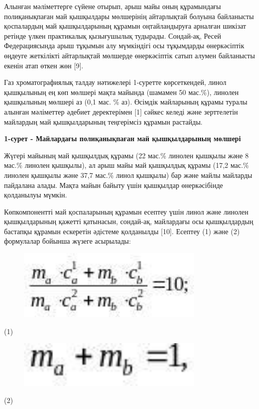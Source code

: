 Алынған мәліметтерге сүйене отырып, арыш майы оның құрамындағы
полиқанықпаған май қышқылдары мөлшерінің айтарлықтай болуына байланысты
қоспалардың май қышқылдарының құрамын оңтайландыруға арналған шикізат
ретінде үлкен практикалық қызығушылық тудырады. Сондай-ақ, Ресей
Федерациясында арыш тұқымын алу мүмкіндігі осы тұқымдарды өнеркәсіптік
өңдеуге жеткілікті айтарлықтай мөлшерде өнеркәсіптік сатып алумен
байланысты екенін атап өткен жөн {[}9{]}.

Газ хроматографиялық талдау нәтижелері 1-суретте көрсеткендей, линол
қышқылының ең көп мөлшері мақта майында (шамамен 50 мас.\%), линолен
қышқылының мөлшері аз (0,1 мас. \% аз). Өсімдік майларының құрамы туралы
алынған мәліметтер әдебиет деректерімен {[}1{]} сәйкес келеді және
зерттелетін майлардың май қышқылдарының теңгерімсіз құрамын растайды.

{\bfseries 1-сурет - Майлардағы полиқанықпаған май қышқылдарының мөлшері}

Жүгері майының май қышқылдық құрамы (22 мас.\% линолен қышқылы және 8
мас.\% линолен қышқылы), ал арыш майы май қышқылдық құрамы (17,2 мас.\%
линолен қышқылы және 37,7 мас.\% линол қышқылы) бар және майлы майларды
пайдалана алады. Мақта майын байыту үшін қышқылдар өнеркәсібінде
қолданылуы мүмкін.

Көпкомпонентті май қоспаларының құрамын есептеу үшін линол және линолен
қышқылдарының қажетті қатынасын, сондай-ақ, майлардағы осы қышқылдардың
бастапқы құрамын ескеретін әдістеме қолданылды {[}10{]}. Есептеу (1)
және (2) формулалар бойынша жүзеге асырылады:

\begin{figure}[H]
	\centering
	\includegraphics[width=0.8\textwidth]{assets/1099}
	\caption*{}
\end{figure} (1)

\begin{figure}[H]
	\centering
	\includegraphics[width=0.8\textwidth]{assets/1100}
	\caption*{}
\end{figure} (2)

